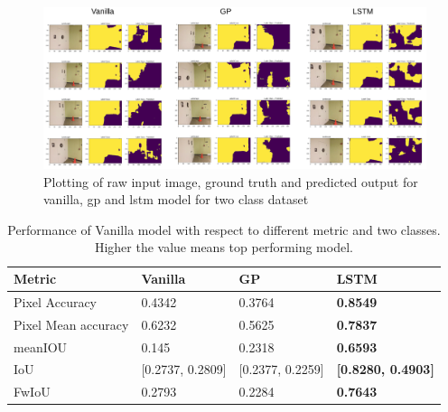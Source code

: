 	\begin{figure}[h]
		\centering
		\includegraphics[width=16cm]{images/output_unet_two_classes.png}
		\caption{Plotting of raw input image, ground truth and predicted output for vanilla, gp and lstm model for two class dataset}
		\label{fig:output_vanilla}
	\end{figure}
	
	\begin{table}[h]
		\begin{center}
			\begin{tabular}{ | l | l | l | p{4cm} |}
				\hline
				
				\cellcolor{purple!30}Metric & \cellcolor{purple!30}Vanilla & \cellcolor{purple!30}GP & \cellcolor{purple!30}LSTM\\ \hline
				Pixel Accuracy & 0.4342 & 0.3764 & { \bf 0.8549 }\\ \hline
				Pixel Mean accuracy & 0.6232 & 0.5625 & { \bf 0.7837 }  \\ \hline
				meanIOU & 0.145 & 0.2318 & { \bf 0.6593 }  \\ \hline
				IoU & [0.2737, 0.2809] & [0.2377, 0.2259] & { \bf [0.8280, 0.4903] } \\ \hline
				FwIoU & 0.2793 & 0.2284 & { \bf 0.7643 } \\ \hline
				\hline
			\end{tabular}
			\caption{Performance of Vanilla model with respect to different metric and two classes. Higher the value means top performing model.}
			\label{table:unet_two_classes}
		\end{center}
	\end{table}
	
	

